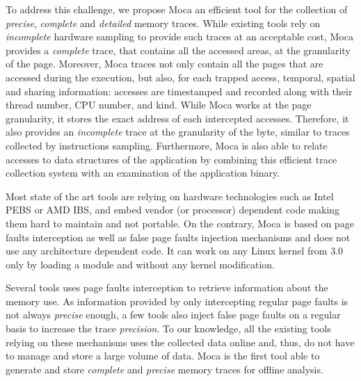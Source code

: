 To address this challenge, we propose \gls{Moca} an efficient tool for the collection of \emph{precise},
\emph{complete} and \emph{detailed} memory traces. While existing tools
rely on \emph{incomplete} hardware sampling to
provide such traces at an acceptable cost, \gls{Moca} provides a \emph{complete}
trace, that contains all the accessed areas, at the granularity of the page.
Moreover, \gls{Moca} traces not only
contain all the pages that are accessed during the execution, but also, 
for each trapped access, temporal, spatial and sharing
information: accesses are timestamped and recorded along with their thread number, CPU number, and kind.
While \gls{Moca} works at the page granularity, it stores the exact
address of each intercepted accesses. Therefore, it also provides an
\emph{incomplete} trace at the granularity of the byte, similar to
traces collected by instructions sampling. Furthermore, \gls{Moca} is also able to relate accesses to
data structures of the application by combining this efficient trace collection system with an examination
of the application binary.

Most state of the art tools are relying on hardware technologies such as Intel PEBS
or AMD IBS, and embed vendor (or processor) dependent code making them hard
to maintain and not portable. On the contrary, \gls{Moca} is based on page
faults interception as well as false page faults injection mechanisms and does not use any architecture dependent code.
It can work on any Linux kernel from $3.0$ only by loading a module and
without any kernel modification.

Several tools uses page faults interception to retrieve information about the memory
use. As information provided by only intercepting regular page faults
is not always \emph{precise} enough, a few tools also inject false page faults
on a regular basis to increase the trace \emph{precision}. To our knowledge, all the
existing tools relying on these mechanisms uses the collected data online and,
thus, do not have to manage and store a large volume of data. \gls{Moca} is the
first tool able to generate and store \emph{complete} and \emph{precise} memory traces for offline
analysis.

